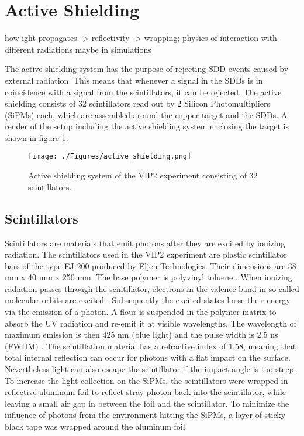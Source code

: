 \section{Active Shielding}

how ight propagates -> reflectivity -> wrapping; physics of interaction with different radiations maybe in simulations

The active shielding system has the purpose of rejecting SDD events caused by external radiation. This means that whenever a signal in the SDDs is in coincidence with a signal from the scintillators, it can be rejected. The active shielding consists of 32 scintillators read out by 2 Silicon Photomultipliers (SiPMs) each, which are assembled around the copper target and the SDDs. A render of the setup including the active shielding system enclosing the target is shown in figure \ref{fig:active_shielding}.
\begin{figure}[h]
 \centering
 \texttt{[image: ./Figures/active\_shielding.png]}
 \caption{Active shielding system of the VIP2 experiment consisting of 32 scintillators.}
 \label{fig:active_shielding}
\end{figure}

\subsection{Scintillators}

Scintillators are materials that emit photons after they are excited by ionizing radiation. The scintillators used in the VIP2 experiment are plastic scintillator bars of the type EJ-200 produced by Eljen Technologies. Their dimensions are 38 mm x 40 mm x 250 mm. The base polymer is polyvinyl toluene \cite{EljenTechnology}. 
When ionizing radiation passes through the scintillator, electrons in the valence band in so-called molecular orbits are excited \cite{Leo1993}. Subsequently the excited states loose their energy via the emission of a photon. A flour is suspended in the polymer matrix to absorb the UV radiation and re-emit it at visible wavelengths. The wavelength of maximum emission is then 425 nm (blue light) and the pulse width is 2.5 ns (FWHM) \cite{EljenTechnology}. The scintillation material has a refractive index of 1.58, meaning that total internal reflection can occur for photons with a flat impact on the surface. Nevertheless light can also escape the scintillator if the impact angle is too steep. To increase the light collection on the SiPMs, the scintillators were wrapped in reflective aluminum foil to reflect stray photon back into the scintillator, while leaving a small air gap in between the foil and the scintillator. To minimize the influence of photons from the environment hitting the SiPMs, a layer of sticky black tape was wrapped around the aluminum foil. 

